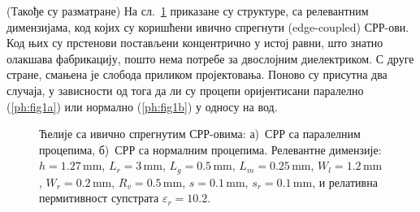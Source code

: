 \newcommand{\labelaslike}{а)~СРР са паралелним процепима, б)~СРР са нормалним процепима. }
(Такође су разматране)
На сл.~\ref{ph:fig1} приказане су структуре, са релевантним димензијама, код којих су коришћени ивично спрегнути (edge-coupled) СРР-ови. Код њих су прстенови постављени концентрично у истој равни, што знатно олакшава фабрикацију, пошто нема потребе за двослојним диелектриком. С друге стране, смањена је слобода приликом пројектовања. Поново су присутна два случаја, у зависности од тога да ли су процепи оријентисани паралелно (\ref{ph:fig1a}) или нормално (\ref{ph:fig1b}) у односу на вод.
\begin{figure}[!t]
\centering
{}
\hfill
{}
\caption{Ћелије са ивично спрегнутим СРР-овима: \labelaslike Релевантне димензије: $h=\num{1.27}\,\mathrm{mm}$, $L_r=3\,\mathrm{mm}$, $L_g=\num{0.5}\,\mathrm{mm}$, $L_m=\num{0.25}\,\mathrm{mm}$, $W_l=\num{1.2}\,\mathrm{mm}$, $W_r=\num{0.2}\,\mathrm{mm}$, $R_v=\num{0.5}\,\mathrm{mm}$, $s=\num{0.1}\,\mathrm{mm}$, $s_r=\num{0.1}\,\mathrm{mm}$, и релативна пермитивност супстрата $\varepsilon_r=\num{10.2}$.}
\label{ph:fig1}
\end{figure} 

